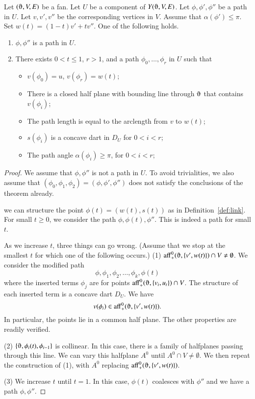 \begin{lemma}
Let $(\orgn,V,E)$ be a fan.  Let $U$ be a component of $Y(\orgn,V,E)$.
Let $\phi,\phi',\phi''$ be 
a path in $U$.
Let $v,v',v''$ be the corresponding vertices in $V$.
Assume that $\alpha(\phi')\le\pi$.
Set $w(t) = (1-t) v' + t v''$.  One of the following holds.
\begin{enumerate}
 \item $\phi,\phi''$ is a path in $U$.
 \item There exists $0 < t \le 1$, $r>1$, and a path $\phi_0,\ldots,\phi_r$ in $U$ such that
   \begin{itemize}
    \item $v(\phi_0) = u$, $v(\phi_r) = w(t)$;
    \item There is a closed half plane with bounding line through $\orgn$ that contains $v(\phi_i)$;
     \item The path length is equal to the arclength from $v$ to $w(t)$;
     \item $s(\phi_i)$ is a concave dart in $D_U$ for $0 < i < r$;
     \item The path angle $\alpha(\phi_i) \ge \pi$, for $0 < i < r$;
   \end{itemize}
\end{enumerate}
\end{lemma}

\begin{proof} We assume that $\phi,\phi''$ is not a path in $U$.
To avoid trivialities,
we also assume that $(\phi_0,\phi_1,\phi_2)=(\phi,\phi',\phi'')$
does not satisfy the conclusions of the theorem already.

we can structure the point $\phi(t)=(w(t),s(t))$ as in Definition~\ref{def:link}.  For small $t\ge 0$, we consider the path
$\phi,\phi(t),\phi''$.  This is indeed a path for small $t$.

As we increase $t$, three things can go wrong.  (Assume that
we stop at the smallest $t$ for which one of the following occurs.)
(1)  $\op{aff}_+^0(\orgn,\{v',w(t)\})\cap V\ne\emptyset$.
We consider the modified path
 $$
   \phi,
   \phi_1,\phi_2,\ldots,\phi_k,\phi(t)
   $$
where the inserted terms $\phi_j$ are for points 
 $\op{aff}_+^0(\orgn,\{v_i,u_t\})\cap V$. The structure of each
inserted term is a concave dart $D_U$.
We have
   $$v(\phi_i)\in \op{aff}_+^0(\orgn,\{v',w(t)\}).$$
In particular, the points lie in a common half plane.  The other
properties are readily verified.

(2) $\{\orgn,\phi_i(t),\phi_{i-1}\}$ is collinear.  In this case,
there is a family of halfplanes passing through this line.  We can
vary this halfplane $A^0$ until $A^0\cap V\ne\emptyset$.  
We then repeat the construction of (1), with $A^0$ replacing
$\op{aff}_+^0(\orgn,\{v',w(t)\})$.

(3) We increase $t$ until $t=1$.  In this case, $\phi(t)$ coalesces
with $\phi''$ and we have a path $\phi,\phi''$.
\end{proof}

